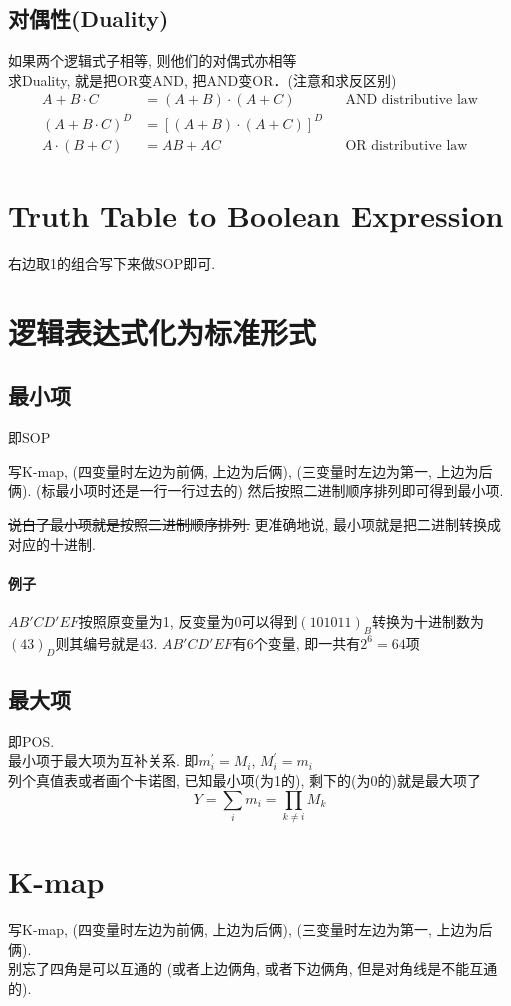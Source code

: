 \documentclass[scheme=chinese,a4paper]{report}
\begin{document}
\subsection{对偶性(Duality)}
如果两个逻辑式子相等, 则他们的对偶式亦相等\\
求Duality, 就是把OR变AND, 把AND变OR．(注意和求反区别)
\begin{align*}
    A+B\cdot C &=(A+B)\cdot (A+C) && \text{AND distributive law}\\
    (A+B\cdot C)^D &=[(A+B)\cdot (A+C)]^D\\
    A\cdot (B+C) &=AB+AC && \text{OR distributive law}
\end{align*}
\section{Truth Table to Boolean Expression}
右边取1的组合写下来做SOP即可. 
\section{逻辑表达式化为标准形式}
\subsection{最小项}
即SOP
\par
写K-map, (四变量时左边为前俩, 上边为后俩), (三变量时左边为第一, 上边为后俩).
(标最小项时还是一行一行过去的)
然后按照二进制顺序排列即可得到最小项. 
\par
\sout{说白了最小项就是按照二进制顺序排列.} 更准确地说, 最小项就是把二进制转换成对应的十进制. 
\paragraph{例子} $AB'CD'EF$按照原变量为1, 反变量为0可以得到$(101011)_B$转换为十进制数为$(43)_D$则其编号就是$43$. $AB'CD'EF$有6个变量, 即一共有$2^6=64$项
\subsection{最大项}
即POS. \\
最小项于最大项为互补关系. 即$m_i^\prime=M_i$, $M_i^\prime=m_i$\\
列个真值表或者画个卡诺图, 已知最小项(为1的), 剩下的(为0的)就是最大项了\\
$$Y=\sum_{i} m_i=\prod_{k\neq i} M_k$$
\section{K-map}
写K-map, (四变量时左边为前俩, 上边为后俩), (三变量时左边为第一, 上边为后俩).\\
别忘了四角是可以互通的 (或者上边俩角, 或者下边俩角, 但是对角线是不能互通的). 
\end{document}

